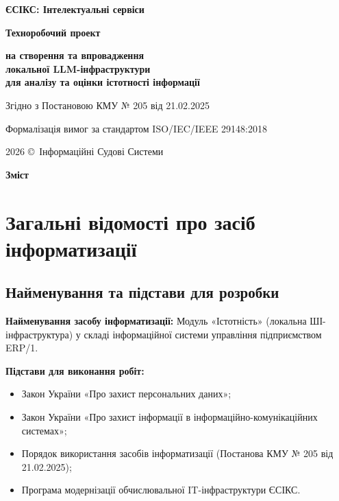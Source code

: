 \documentclass{article}
\newcommand\HUGE[1]{\fontsize{38}{38}\selectfont #1}
\begin{document}
\pagestyle{fancy}

\begin{titlepage}
\AddToShipoutPictureBG*{\AtPageLowerLeft{\color{primary}\rule{\paperwidth}{\paperheight}}}
\color{white}\thispagestyle{empty}\vspace*{3cm}\centering
  {\Huge \textbf{ЄСІКС: Інтелектуальні сервіси} \par} \vspace{1.5cm}
  {\HUGE \textbf{Техноробочий проект} \par} \vspace{1.5cm}
  {\LARGE \textbf{на створення та впровадження \\ локальної LLM-інфраструктури \\ для аналізу та оцінки істотності інформації} \par} \vspace{1.5cm}
  {\large Згідно з Постановою КМУ № 205 від 21.02.2025 \par}
  {\large Формалізація вимог за стандартом ISO/IEC/IEEE 29148:2018 \par}
  \vfill
  {\large 2026 \copyright\ Інформаційні Судові Системи \par}
\end{titlepage}

\newpage
\begin{center}
  {\Huge\color{primary}\bfseries Зміст\par}
\end{center}
\vspace{40pt}
\tableofcontents

\newpage
\section{Загальні відомості про засіб інформатизації}

\subsection{Найменування та підстави для розробки}
\textbf{Найменування засобу інформатизації:} Модуль «Істотність» (локальна ШІ-інфраструктура) у складі інформаційної системи управління підприємством ERP/1.

\textbf{Підстави для виконання робіт:}
\begin{itemize}
    \item Закон України «Про захист персональних даних»;
    \item Закон України «Про захист інформації в інформаційно-комунікаційних системах»;
    \item Порядок використання засобів інформатизації (Постанова КМУ № 205 від 21.02.2025);
    \item Програма модернізації обчислювальної IT-інфраструктури ЄСІКС.
\end{itemize}
\end{document}
